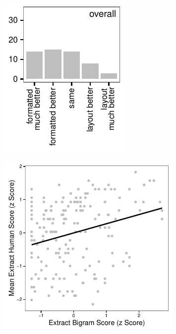         \noindent\makebox[\linewidth]{\rule{\textwidth}{0.4pt}}

	  \begin{figure}
		\centering
		\begin{minipage}{.25\textwidth}
		  \centering
		  \includegraphics[width=\textwidth]{graphs/layout_vs_formatted_hists}
		  \label{fig:lay_vs_formatted_hist}
		\end{minipage}%
		\begin{minipage}{.5\textwidth}
		  \centering
		  \includegraphics[width=0.8\textwidth]{graphs/scatter}

\end{minipage}
\end{figure}
